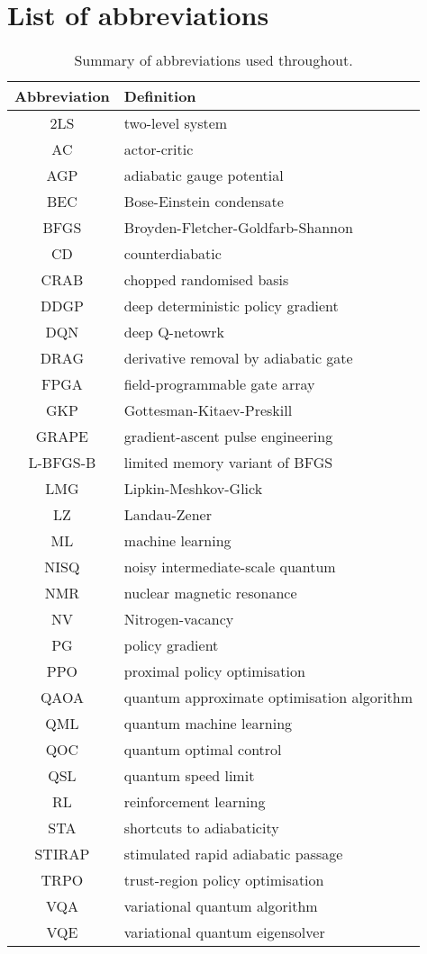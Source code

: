 \appendix*
\section*{List of abbreviations}
\begin{table}[!h]
\centering
\begin{tabular}{|c|p{7.5cm}|}
\hline
Abbreviation & Definition \\
\hline\hline
2LS & two-level system \\
\hline
AC & actor-critic \\
\hline
AGP & adiabatic gauge potential \\
\hline
BEC & Bose-Einstein condensate \\
\hline
BFGS & Broyden-Fletcher-Goldfarb-Shannon \\
\hline
CD & counterdiabatic \\
\hline
CRAB & chopped randomised basis \\
\hline
DDGP & deep deterministic policy gradient \\
\hline
DQN & deep Q-netowrk \\
\hline
DRAG & derivative removal by adiabatic gate \\
\hline
FPGA & field-programmable gate array \\
\hline
GKP & Gottesman-Kitaev-Preskill \\
\hline
GRAPE & gradient-ascent pulse engineering \\
\hline
L-BFGS-B & limited memory variant of BFGS \\
\hline
LMG & Lipkin-Meshkov-Glick \\
\hline
LZ & Landau-Zener \\
\hline
ML & machine learning \\
\hline
NISQ & noisy intermediate-scale quantum \\
\hline
NMR & nuclear magnetic resonance \\
\hline
NV & Nitrogen-vacancy \\
\hline
PG & policy gradient \\
\hline
PPO & proximal policy optimisation \\
\hline
QAOA & quantum approximate optimisation algorithm \\
\hline
QML & quantum machine learning \\
\hline
QOC & quantum optimal control \\
\hline
QSL & quantum speed limit \\
\hline
RL & reinforcement learning \\
\hline
STA & shortcuts to adiabaticity \\
\hline
STIRAP & stimulated rapid adiabatic passage \\
\hline
TRPO & trust-region policy optimisation \\
\hline
VQA & variational quantum algorithm \\
\hline
VQE & variational quantum eigensolver \\
\hline

\hline
\end{tabular}
\caption{Summary of abbreviations used throughout.}
\label{table:Abbreviations}
\end{table}


